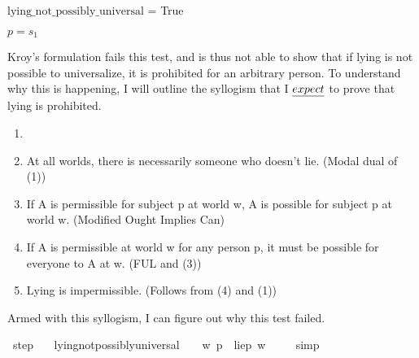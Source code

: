 \begin{isabellebody}
{    $\text{lying\_not\_possibly\_universal}$ = True

    $p = s_1$ \color{black}%
}%
\endisatagproof
{\isafoldproof}%
%
\isadelimproof
%
\endisadelimproof
%
\begin{isamarkuptext}%
Kroy's formulation fails this test, and is thus not able to show that if lying is not possible 
      to universalize, it is prohibited for an arbitrary person. To understand why this is happening, I 
      will outline the syllogism that I $\emph{expect}$ to prove that lying is prohibited.%
\end{isamarkuptext}\isamarkuptrue%
%
\begin{enumerate}
        \item {}
        \item At all worlds, there is necessarily someone who doesn't lie. (Modal dual of (1))
        \item If A is permissible for subject p at world w, A is possible for subject p at world w. (Modified Ought Implies Can)
        \item If A is permissible at world w for any person p, it must be possible for everyone to A at w. (FUL and (3)) 
        \item Lying is impermissible. (Follows from (4) and (1)) \end{enumerate}
%
\begin{isamarkuptext}%
Armed with this syllogism, I can figure out why this test failed.%
\end{isamarkuptext}\isamarkuptrue%
\isamarkupfalse%
\ step{}{\isacharcolon}\isanewline
\ \ \ {\isachardoublequoteopen}lying{\isacharunderscore}not{\isacharunderscore}possibly{\isacharunderscore}universal\ {\isasymlongrightarrow}\ {\isasymTurnstile}{\isacharparenleft}\ {\isacharparenleft}{\isasymbox}\ {\isacharparenleft}{\isasymlambda}w{\isachardot}\ {\isasymexists}p{\isachardot}\ {\isacharparenleft}\isactrlbold {\isasymnot}\ {\isacharparenleft}lie{\isacharparenleft}p{\isacharparenright}{\isacharparenright}\ w{\isacharparenright}{\isacharparenright}{\isacharparenright}{\isacharparenright}\ {\isachardoublequoteclose}\isanewline
%
\isadelimproof
\ \ %
\endisadelimproof
%
\isatagproof
{}\isamarkupfalse%
\ simp\isanewline
%
%
\endisatagproof
{\isafoldproof}%
%
\isadelimproof
\isanewline
%
\endisadelimproof
\isanewline
{}\isamarkupfalse%

\end{isabellebody}
